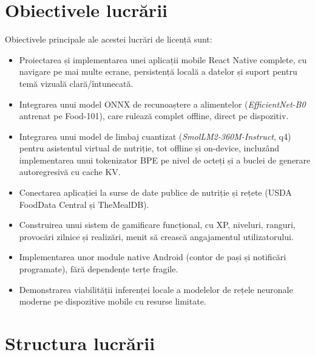 \documentclass[12pt, a4paper, twoside]{report}
\numberwithin{equation}{section}
\begin{document}
\section{Obiectivele lucrării}

Obiectivele principale ale acestei lucrări de licență sunt:

\begin{itemize}
  \item Proiectarea și implementarea unei aplicații mobile React Native complete, cu
    navigare pe mai multe ecrane, persistență locală a datelor și suport pentru temă
    vizuală clară/întunecată.
  \item Integrarea unui model ONNX de recunoaștere a alimentelor (\textit{EfficientNet-B0}
    antrenat pe Food-101), care rulează complet offline, direct pe dispozitiv.
  \item Integrarea unui model de limbaj cuantizat (\textit{SmolLM2-360M-Instruct}, q4) pentru
    asistentul virtual de nutriție, tot offline și on-device, incluzând implementarea unui
    tokenizator BPE pe nivel de octeți și a buclei de generare autoregresivă cu cache KV.
  \item Conectarea aplicației la surse de date publice de nutriție și rețete (USDA
    FoodData Central și TheMealDB).
  \item Construirea unui sistem de gamificare funcțional, cu XP, niveluri, ranguri, provocări
    zilnice și realizări, menit să crească angajamentul utilizatorului.
  \item Implementarea unor module native Android (contor de pași și notificări programate),
    fără dependențe terțe fragile.
  \item Demonstrarea viabilității inferenței locale a modelelor de rețele neuronale moderne
    pe dispozitive mobile cu resurse limitate.
\end{itemize}

\section{Structura lucrării}
\end{document}
